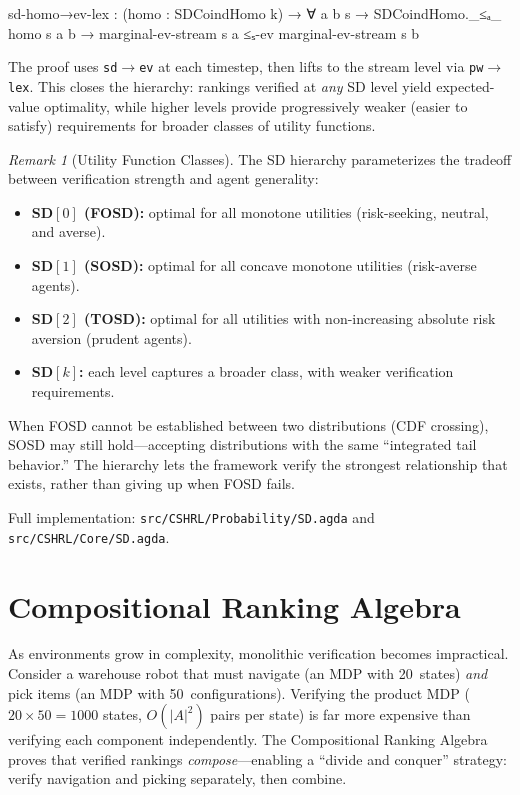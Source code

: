 \documentclass[9pt,a4paper]{article}
\newcommand{\fpath}[1]{\nolinkurl{#1}}
\theoremstyle{plain}
\theoremstyle{definition}
\theoremstyle{remark}
\newtheorem{remark}{Remark}
\begin{document}
\begin{spec}
  sd-homo→ev-lex : (homo : SDCoindHomo k) →
    ∀ a b s → SDCoindHomo._≤ₐ_ homo s a b →
      marginal-ev-stream s a ≤ₛ-ev marginal-ev-stream s b
\end{spec}

\noindent The proof uses \texttt{sd$\to$ev} at each timestep, then lifts to the stream level via \texttt{pw$\to$lex}.  This closes the hierarchy: rankings verified at \emph{any} SD level yield expected-value optimality, while higher levels provide progressively weaker (easier to satisfy) requirements for broader classes of utility functions.

\begin{remark}[Utility Function Classes]
The SD hierarchy parameterizes the tradeoff between verification strength and agent generality:
\begin{itemize}
\item \textbf{SD$[0]$ (FOSD):} optimal for all monotone utilities (risk-seeking, neutral, and averse).
\item \textbf{SD$[1]$ (SOSD):} optimal for all concave monotone utilities (risk-averse agents).
\item \textbf{SD$[2]$ (TOSD):} optimal for all utilities with non-increasing absolute risk aversion (prudent agents).
\item \textbf{SD$[k]$:} each level captures a broader class, with weaker verification requirements.
\end{itemize}
When FOSD cannot be established between two distributions (CDF crossing), SOSD may still hold---accepting distributions with the same ``integrated tail behavior.''  The hierarchy lets the framework verify the strongest relationship that exists, rather than giving up when FOSD fails.
\end{remark}

\noindent Full implementation: \fpath{src/CSHRL/Probability/SD.agda} and \fpath{src/CSHRL/Core/SD.agda}.

\section{Compositional Ranking Algebra}\label{sec:compose}

As environments grow in complexity, monolithic verification becomes impractical.  Consider a warehouse robot that must navigate (an MDP with 20~states) \emph{and} pick items (an MDP with 50~configurations).  Verifying the product MDP ($20 \times 50 = 1000$ states, $O(|A|^2)$ pairs per state) is far more expensive than verifying each component independently.  The Compositional Ranking Algebra proves that verified rankings \emph{compose}---enabling a ``divide and conquer'' strategy: verify navigation and picking separately, then combine.
\end{document}
